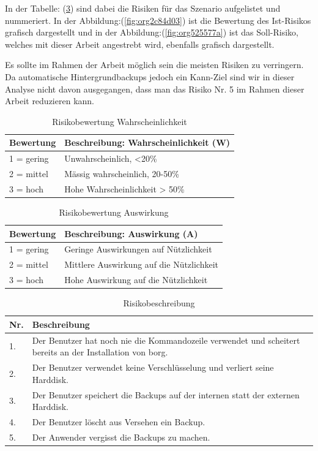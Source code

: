 In der Tabelle: (\ref{tab:orgb156d31}) sind dabei die Risiken für das
Szenario aufgelistet und nummeriert. In der Abbildung:(\ref{fig:org2c84d03}) ist die
Bewertung des Ist-Risikos grafisch dargestellt und in der
Abbildung:(\ref{fig:org525577a}) ist das Soll-Risiko, welches mit dieser Arbeit
angestrebt wird, ebenfalls grafisch dargestellt.

Es sollte im Rahmen der Arbeit möglich sein die meisten Risiken zu verringern.
Da automatische Hintergrundbackups jedoch ein Kann-Ziel sind wir in dieser
Analyse nicht davon ausgegangen, dass man das Risiko Nr. 5 im Rahmen dieser
Arbeit reduzieren kann.

\begin{table}[H]
\centering
\begin{tabular}{l|l}
\textbf{Bewertung} & \textbf{Beschreibung: Wahrscheinlichkeit (W)}\\
\hline
1 = gering & Unwahrscheinlich, <20\%\\
2 = mittel & Mässig wahrscheinlich, 20-50\%\\
3 = hoch & Hohe Wahrscheinlichkeit > 50\%\\
\end{tabular}
\caption{\label{tab:orgc24b878}
Risikobewertung Wahrscheinlichkeit}

\end{table}

\begin{table}[H]
\centering
\begin{tabular}{l|l}
\textbf{Bewertung} & \textbf{Beschreibung: Auswirkung (A)}\\
\hline
1 = gering & Geringe Auswirkungen auf Nützlichkeit\\
2 = mittel & Mittlere Auswirkung auf die Nützlichkeit\\
3 = hoch & Hohe Auswirkung auf die Nützlichkeit\\
\end{tabular}
\caption{\label{tab:org8a27a35}
Risikobewertung Auswirkung}

\end{table}

\begin{table}[H]
\centering
\begin{tabular}{|>{\columncolor[HTML]{EFEFEF}}p{}|p{}|}
\hline
\textbf{Nr.}\cellcolor[HTML]{C0C0C0} & \textbf{Beschreibung}\cellcolor[HTML]{C0C0C0}\\
\hline
1. & Der Benutzer hat noch nie die Kommandozeile verwendet und scheitert bereits an der Installation von \gls{borg}.\\
\hline
2. & Der Benutzer verwendet keine Verschlüsselung und verliert seine Harddisk.\\
\hline
3. & Der Benutzer speichert die Backups auf der internen statt der externen Harddisk.\\
\hline
4. & Der Benutzer löscht aus Versehen ein Backup.\\
\hline
5. & Der Anwender vergisst die Backups zu machen.\\
\hline
\end{tabular}
\caption{\label{tab:orgb156d31}
Risikobeschreibung}

\end{table}

